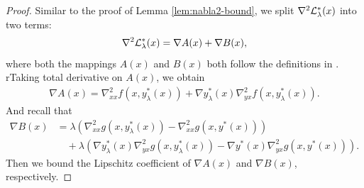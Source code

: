 \begin{proof}
Similar to the proof of Lemma \ref{lem:nabla2-bound},  we split $\nabla^2 {\mathcal{L}}_{\lambda}^*(x)$ into two terms:
\begin{align*}
    \nabla^2 {\mathcal{L}}_{\lambda}^*(x) = \nabla A(x) + \nabla B(x),
\end{align*}
where both the mappings $A(x)$ and $B(x)$ both follow the definitions in . 
rTaking total derivative on $A(x)$, we obtain
\begin{align*}
    \nabla A(x) = \nabla_{xx}^2 f(x,y_{\lambda}^*(x)) + \nabla y_{\lambda}^*(x) \nabla_{yx}^2 f(x,y_{\lambda}^*(x)).
\end{align*}
And recall  that 
\begin{align*}
    \nabla B(x) &= \lambda (\nabla_{xx}^2 g(x,y_{\lambda}^*(x))-\nabla_{xx}^2 g(x,y^*(x))) \\
    &\quad + \lambda \left(\nabla y_{\lambda}^*(x)  \nabla_{yx}^2 g(x,y_{\lambda}^*(x)) - \nabla y^*(x) \nabla_{yx}^2 g(x,y^*(x)) \right).
\end{align*}
Then we bound the Lipschitz coefficient of $\nabla A(x)$ and $\nabla B(x)$, respectively. 


\end{proof}
